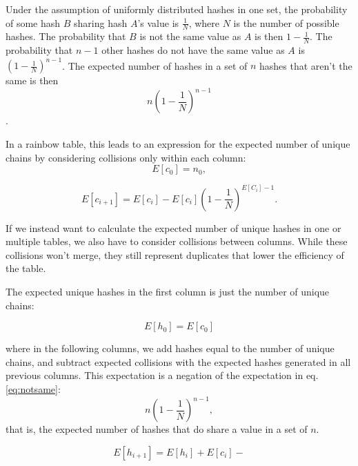 \documentclass[]{paper}
\begin{document}
Under the assumption of uniformly distributed hashes in one set, the probability of some hash $B$ sharing hash $A$'s value is $\frac{1}{N}$, where $N$ is the number of possible hashes. The probability that $B$ is not the same value as $A$ is then $1 - \frac{1}{N}$. The probability that $n - 1$ other hashes do not have the same value as $A$ is $(1 - \frac{1}{N})^{n - 1}$. The expected number of hashes in a set of $n$ hashes that aren't the same is then
\begin{equation}
\label{eq:notsame}
n(1 - \frac{1}{N})^{n - 1}
\end{equation}.

In a rainbow table, this leads to an expression for the expected number of unique chains by considering collisions only within each column:
\begin{equation}
E[c_0] = n_0,
\end{equation}

\begin{equation}
E[c_{i+1}] = E[c_i] - E[c_i](1 - \frac{1}{N})^{E[C_i] - 1}.
\end{equation}

If we instead want to calculate the expected number of unique hashes in one or multiple tables, we also have to consider collisions between columns. While these collisions won't merge, they still represent duplicates that lower the efficiency of the table. 

The expected unique hashes in the first column is just the number of unique chains:

\begin{equation}
E[h_0] = E[c_0]
\end{equation}

where in the following columns, we add hashes equal to the number of unique chains, and subtract expected collisions with the expected hashes generated in all previous columns. This expectation is a negation of the expectation in eq. \ref{eq:notsame}:
\begin{equation}
n(1 - \frac{1}{N})^{n - 1},
\end{equation}
that is, the expected number of hashes that do share a value in a set of $n$. 

\begin{equation}
E[h_{i+1}] = E[h_i] + E[c_i] - 
\end{equation}
\end{document}
